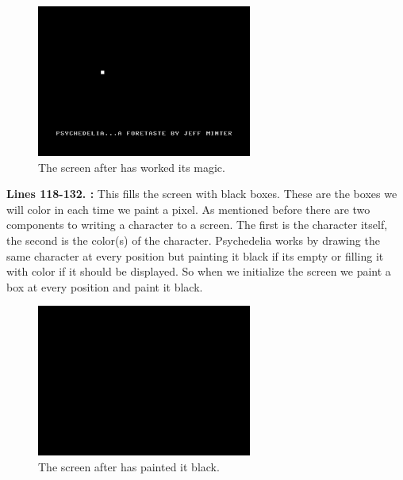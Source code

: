 {\begin{figure}[H]
    \centering
      \includegraphics[height=5cm]{src/listing_commentary/foretaste.png}
  \caption*{The screen after  has worked its magic.}
\end{figure}

\bigskip
\bigskip
\bigskip
\bigskip
\textbf{Lines 118-132. :} This fills the screen with black boxes. These are the boxes we will color in each time we paint a pixel.
As mentioned before there are two components to writing a character to a screen. The first is the character
itself, the second is the color(s) of the character. Psychedelia works by drawing the same character at every
position but painting it black if its empty or filling it with color if it should be displayed. So when
we initialize the screen we paint a box at every position and paint it black.

\begin{figure}[H]
    \centering
      \includegraphics[height=5cm]{src/listing_commentary/black.png}
  \caption*{The screen after  has painted it black.}
\end{figure}

}
